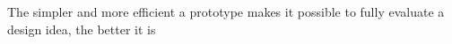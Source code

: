 \begin{principle} \label{prin:economic_principle_of_prototyping}  
  The simpler and more efficient a prototype makes it possible to fully evaluate a design idea, the better it is \cite[p. 7:4]{lim}
\end{principle}